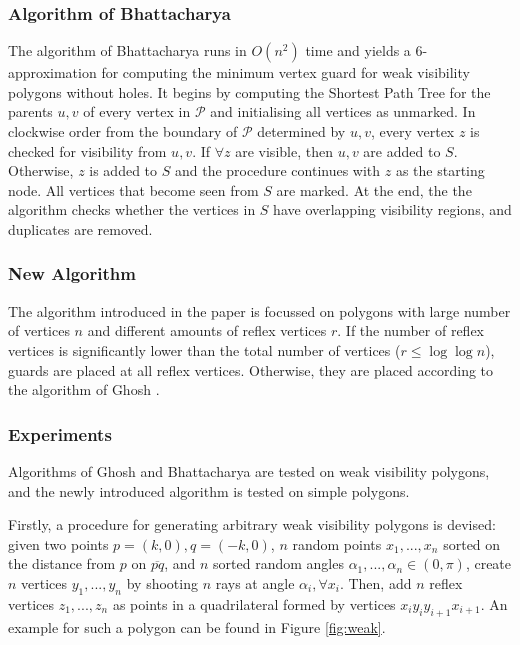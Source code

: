 \subsubsection{Algorithm of Bhattacharya \cite{bhattacharya2016approximability}}
The algorithm of Bhattacharya \cite{bhattacharya2016approximability} runs in $O(n^2)$ time and yields a 6-approximation for computing the minimum vertex guard for weak visibility polygons without holes. It begins by computing the Shortest Path Tree for the parents $u, v$ of every vertex in $\mathcal P$ and initialising all vertices as unmarked. In clockwise order from the boundary of $\mathcal P$ determined by $u, v$, every vertex $z$ is checked for visibility from $u, v$. If $\forall z$ are visible, then $u, v$ are added to $S$. Otherwise, $z$ is added to $S$ and the procedure continues with $z$ as the starting node. All vertices that become seen from $S$ are marked. At the end, the the algorithm checks whether the vertices in $S$ have overlapping visibility regions, and duplicates are removed.

\subsubsection{New Algorithm}
The algorithm introduced in the paper is focussed on polygons with large number of vertices $n$ and different amounts of reflex vertices $r$. If the number of reflex vertices is significantly lower than the total number of vertices ($r \leq \log \log n$), guards are placed at all reflex vertices. Otherwise, they are placed according to the algorithm of Ghosh \cite{GHOSH2010718}.

\subsubsection{Experiments}
Algorithms of Ghosh \cite{GHOSH2010718} and Bhattacharya \cite{bhattacharya2016approximability} are tested on weak visibility polygons, and the newly introduced algorithm is tested on simple polygons. 

Firstly, a procedure for generating arbitrary weak visibility polygons is devised: given two points $p = (k, 0), q = (-k, 0)$,  $n$ random points $x_1, ..., x_n$ sorted on the distance from $p$ on $\overline{pq}$, and $n$ sorted random angles $\alpha_1, ..., \alpha_n \in  (0, \pi)$, create $n$ vertices $y_1, ..., y_n$ by shooting $n$ rays at angle $\alpha_i, \forall x_i$. Then, add $n$ reflex vertices $z_1, ..., z_n$ as points in a quadrilateral formed by vertices $x_iy_iy_{i + 1}x_{i + 1}$. An example for such a polygon can be found in Figure \ref{fig:weak}.

